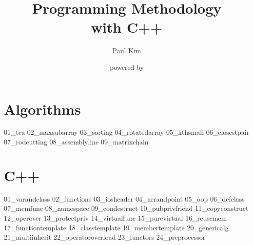 \documentclass[10pt,openany,a4pper]{book}
\begin{document}
\begin{titlepage}
    \title{Programming Methodology\\{\Large with C++}}
    \author{Paul Kim}
    \date{powered by \LaTeXe{}}
\maketitle
\end{titlepage}
\pagestyle{styletoc}
\tableofcontents
\newpage

\part{Algorithms}
\pagestyle{stylemain}
{01_tca}
{02_maxsubarray}
{03_sorting}
{04_rotatedarray}
{05_kthsmall}
{06_closestpair}
{07_rodcutting}
{08_assemblyline}
{09_matrixchain}

\part{C++}

{01_varandclass}
{02_functions}
{03_iosheader}
{04_arrandpoint}
{05_oop}
{06_defclass}
{07_memfunc}
{08_namespace}
{09_condestruct}
{10_pubprivfriend}
{11_copyconstruct}
{12_operover}
{13_protectpriv}
{14_virtualfunc}
{15_purevirtual}
{16_reusemem}
{17_functiontemplate}
{18_classtemplate}
{19_membertemplate}
{20_genericalg}
{21_multiinherit}
{22_operatoroverload}
{23_functors}
{24_preprocessor}
\end{document}
